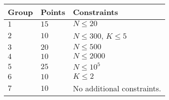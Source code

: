\noindent
\begin{tabular}{| l | l | l |}
  \hline
  \textbf{Group} & \textbf{Points} & \textbf{Constraints} \\ \hline
  $1$   & $15$       & $N \leq 20$\\ \hline
  $2$   & $10$       & $N \leq 300$, $K \leq 5$  \\ \hline
  $3$   & $20$       & $N \leq 500$ \\ \hline
  $4$   & $10$       & $N \leq 2000$ \\ \hline
  $5$   & $25$       & $N \leq 10^5$ \\ \hline
  $6$   & $10$       & $K \leq 2$ \\ \hline
  $7$   & $10$       & No additional constraints. \\ \hline
\end{tabular}
